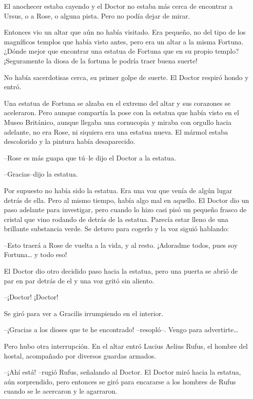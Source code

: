 El anochecer estaba cayendo y el Doctor no estaba más cerca de encontrar
a Ursus, o a Rose, o alguna pista. Pero no podía dejar de mirar.

Entonces vio un altar que aún no había visitado. Era pequeño, no del
tipo de los magníficos templos que había visto antes, pero era un altar
a la misma Fortuna. ¿Dónde mejor que encontrar una estatua de Fortuna
que en su propio templo? ¡Seguramente la diosa de la fortuna le podría
traer buena suerte!

No había sacerdotisas cerca, su primer golpe de suerte. El Doctor
respiró hondo y entró.

Una estatua de Fortuna se alzaba en el extremo del altar y sus corazones
se aceleraron. Pero aunque compartía la pose con la estatua que había
visto en el Museo Británico, aunque llegaba una cornucopia y miraba con
orgullo hacia adelante, no era Rose, ni siquiera era una estatua nueva.
El mármol estaba descolorido y la pintura había desaparecido.

--Rose es más guapa que tú--le dijo el Doctor a la estatua.

--Gracias--dijo la estatua.

Por supuesto no había sido la estatua. Era una voz que venía de algún
lugar detrás de ella. Pero al mismo tiempo, había algo mal en aquello.
El Doctor dio un paso adelante para investigar, pero cuando lo hizo casi
pisó un pequeño frasco de cristal que vino rodando de detrás de la
estatua. Parecía estar lleno de una brillante substancia verde. Se
detuvo para cogerlo y la voz siguió hablando:

--Esto traerá a Rose de vuelta a la vida, y al resto. ¡Adoradme todos,
pues soy Fortuna\ldots{} y todo eso!

El Doctor dio otro decidido paso hacia la estatua, pero una puerta se
abrió de par en par detrás de el y una voz gritó sin aliento.

--¡Doctor! ¡Doctor!

Se giró para ver a Gracilis irrumpiendo en el interior.

--¡Gracias a los dioses que te he encontrado! --resopló--. Vengo para
advertirte\ldots{}

Pero hubo otra interrupción. En el altar entró Lucius Aelius Rufus, el
hombre del hostal, acompañado por diversos guardas armados.

--¡Ahí está! --rugió Rufus, señalando al Doctor. El Doctor miró hacia la
estatua, aún sorprendido, pero entonces se giró para encararse a los
hombres de Rufus cuando se le acercaron y le agarraron.

